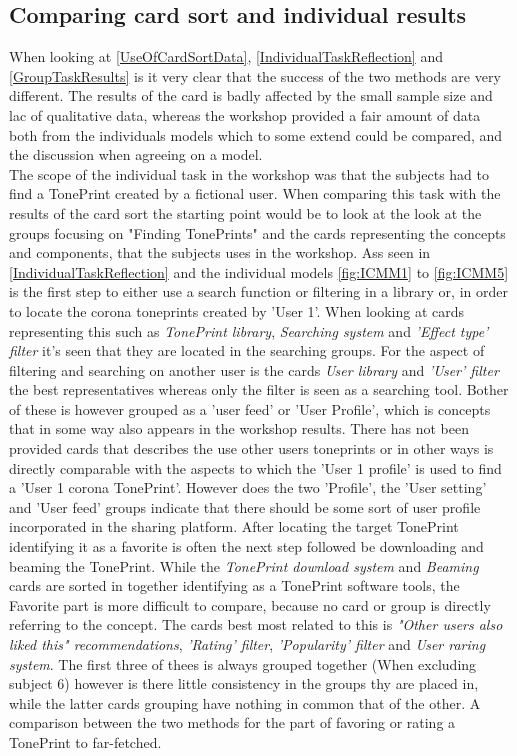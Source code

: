 \subsection*{Comparing card sort and individual results}
\label{ComparingIndividualAndCard}
When looking at \autoref{UseOfCardSortData}, \autoref{IndividualTaskReflection} and \autoref{GroupTaskResults} is it very clear that the success of the two methods are very different. The results of the card is badly affected by the small sample size and lac of qualitative data, whereas the workshop provided a fair amount of data both from the individuals models which to some extend could be compared, and the discussion when agreeing on a model.\\
The scope of the individual task in the workshop was that the subjects had to find a TonePrint created by a fictional user. When comparing this task with the results of the card sort the starting point would be to look at the look at the groups focusing on "Finding TonePrints" and the cards representing the concepts and components, that the subjects uses in the workshop. Ass seen in
\autoref{IndividualTaskReflection} and the individual models \autoref{fig:ICMM1} to \autoref{fig:ICMM5} is the first step to either use a search function or filtering in a library or, in order to locate the corona toneprints created by 'User 1'. When looking at cards representing this such as \textit{TonePrint library}, \textit{Searching system} and \textit{'Effect type' filter} it's seen that they are located in the searching groups. For the aspect of filtering and searching on another user is the cards \textit{User library} and \textit{'User' filter} the best representatives whereas only the filter is seen as a searching tool. Bother of these is however grouped as a 'user feed' or 'User Profile', which is concepts that in some way also appears in the workshop results. There has not been provided cards that describes the use other users toneprints or in other ways is directly comparable with the aspects to which the 'User 1 profile' is used to find a 'User 1 corona TonePrint'. However does the two 'Profile', the 'User setting' and 'User feed' groups indicate that there should be some sort of user profile incorporated in the sharing platform. After locating the target TonePrint identifying it as a favorite is often the next step followed be downloading and beaming the TonePrint. While the \textit{TonePrint download system} and \textit{Beaming} cards are sorted in together identifying as a TonePrint software tools, the Favorite part is more difficult to compare, because no card or group is directly referring to the concept. The cards best most related to this is \textit{"Other users also liked this" recommendations}, \textit{'Rating' filter}, \textit{'Popularity' filter} and \textit{User raring system}. The first three of thees is always grouped together (When excluding subject 6) however is there little consistency in the groups thy are placed in, while the latter cards grouping have nothing in common that of the other. A comparison between the two methods for the part of favoring or rating a TonePrint to far-fetched.\\
\\
